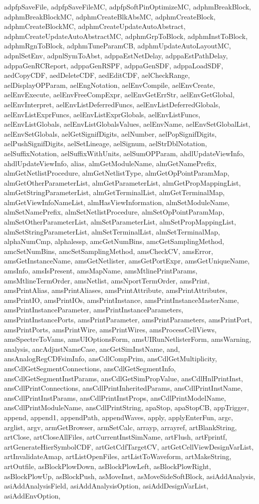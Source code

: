 {{adpfpSaveFile, adpfpSaveFileMC, adpfpSoftPinOptimizeMC, adphmBreakBlock, adphmBreakBlockMC, adphmCreateBlkAbsMC, adphmCreateBlock, adphmCreateBlockMC, adphmCreateUpdateAutoAbstract, adphmCreateUpdateAutoAbstractMC, adphmGrpToBlock, adphmInstToBlock, adphmRgnToBlock, adphmTuneParamCB, adphmUpdateAutoLayoutMC, adpnlSetEnv, adpnlSymToAbst, adppaEstNetDelay, adppaEstPathDelay, adppaGenRCReport, adppaGenRSPF, adppaGenSDF, adppaLoadSDF, aedCopyCDF, aedDeleteCDF, aedEditCDF, aelCheckRange, aelDisplayOPParam, aelEngNotation, aelEnvCompile, aelEnvCreate, aelEnvExecute, aelEnvFreeCompExpr, aelEnvGetErrStr, aelEnvGetGlobal, aelEnvInterpret, aelEnvListDeferredFuncs, aelEnvListDeferredGlobals, aelEnvListExprFuncs, aelEnvListExprGlobals, aelEnvListFuncs, aelEnvListGlobals, aelEnvListGlobalsValues, aelEnvName, aelEnvSetGlobalList, aelEnvSetGlobals, aelGetSignifDigits, aelNumber, aelPopSignifDigits, aelPushSignifDigits, aelSetLineage, aelSignum, aelStrDblNotation, aelSuffixNotation, aelSuffixWithUnits, aelSumOPParam, ahdlUpdateViewInfo, ahdlUpdateViewInfo, alias, almGetModuleName, almGetNamePrefix, almGetNetlistProcedure, almGetNetlistType, almGetOpPointParamMap, almGetOtherParameterList, almGetParameterList, almGetPropMappingList, almGetStringParameterList, almGetTerminalList, almGetTerminalMap, almGetViewInfoNameList, almHasViewInformation, almSetModuleName, almSetNamePrefix, almSetNetlistProcedure, almSetOpPointParamMap, almSetOtherParameterList, almSetParameterList, almSetPropMappingList, almSetStringParameterList, almSetTerminalList, almSetTerminalMap, alphaNumCmp, alphalessp, amcGetNumBins, amcGetSamplingMethod, amcSetNumBins, amcSetSamplingMethod, amsCheckCV, amsError, amsGetInstanceName, amsGetNetlister, amsGetPortExpr, amsGetUniqueName, amsInfo, amsIsPresent, amsMapName, amsMtlinePrintParams, amsMtlineTermOrder, amsNetlist, amsNportTermOrder, amsPrint, amsPrintAlias, amsPrintAliases, amsPrintAttribute, amsPrintAttributes, amsPrintIO, amsPrintIOs, amsPrintInstance, amsPrintInstanceMasterName, amsPrintInstanceParameter, amsPrintInstanceParameters, amsPrintInstancePorts, amsPrintParameter, amsPrintParameters, amsPrintPort, amsPrintPorts, amsPrintWire, amsPrintWires, amsProcessCellViews, amsSpectreToVams, amsUIOptionsForm, amsUIRunNetlisterForm, amsWarning, analysis, ancAdjustNameCase, ancGetSimInstName, and, ansAnalogRegCDFsimInfo, ansCdlCompPrim, ansCdlGetMultiplicity, ansCdlGetSegmentConnections, ansCdlGetSegmentInfo, ansCdlGetSegmentInstParams, ansCdlGetSimPropValue, ansCdlHnlPrintInst, ansCdlPrintConnections, ansCdlPrintInheritedParams, ansCdlPrintInstName, ansCdlPrintInstParams, ansCdlPrintInstProps, ansCdlPrintModelName, ansCdlPrintModuleName, ansCdlPrintString, apaStop, apaStopCB, appTrigger, append, append1, appendPath, appendWaves, apply, applyEnterFun, argc, arglist, argv, armGetBrowser, armSetCalc, arrayp, arrayref, artBlankString, artClose, artCloseAllFiles, artCurrentInstSimName, artFlush, artFprintf, artGenerateHierSymbolCDF, artGetCdfTargetCV, artGetCellViewDesignVarList, artInvalidateAmap, artListOpenFiles, artListToWaveform, artMakeString, artOutfile, asBlockPlowDown, asBlockPlowLeft, asBlockPlowRight, asBlockPlowUp, asBlockPush, asMoveInst, asMoveSideSoftBlock, asiAddAnalysis, asiAddAnalysisField, asiAddAnalysisOption, asiAddDesignVarList, asiAddEnvOption, }}
